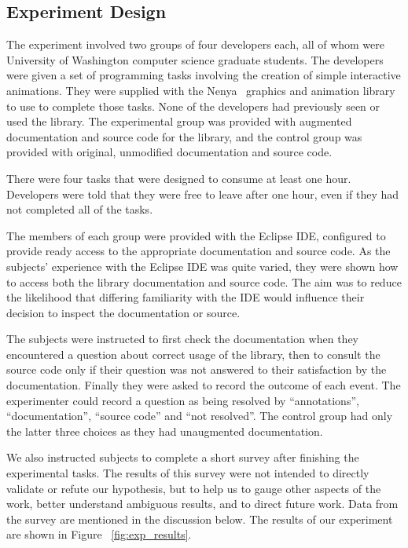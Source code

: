 \medskip
\subsection{Experiment Design}
The experiment involved two groups of four developers each, all of whom were
University of Washington computer science graduate students. The developers
were given a set of programming tasks involving the creation of simple
interactive animations. They were supplied with the Nenya~\cite{nenya} graphics
and animation library to use to complete those tasks. None of the developers had
previously seen or used the library. The experimental group was provided with
augmented documentation and source code for the library, and the control group
was provided with original, unmodified documentation and source code.

There were four tasks that were designed to consume at least one
hour. Developers were told that they were free to leave after one hour, even if
they had not completed all of the tasks.

The members of each group were provided with the Eclipse IDE, configured to
provide ready access to the appropriate documentation and source code. As the
subjects' experience with the Eclipse IDE was quite varied, they were shown how
to access both the library documentation and source code. The aim was to reduce
the likelihood that differing familiarity with the IDE would influence their
decision to inspect the documentation or source.

The subjects were instructed to first check the documentation when they
encountered a question about correct usage of the library, then to consult the
source code only if their question was not answered to their satisfaction by
the documentation. Finally they were asked to record the outcome of each event.
The experimenter could record a question as being resolved by ``annotations'',
``documentation'', ``source code'' and ``not resolved''. The control group had
only the latter three choices as they had unaugmented documentation.

We also instructed subjects to complete a short survey after finishing the
experimental tasks. The results of this survey were not intended to directly
validate or refute our hypothesis, but to help us to gauge other aspects of the
work, better understand ambiguous results, and to direct future work. Data from
the survey are mentioned in the discussion below. The results of our experiment
are shown in Figure ~\ref{fig:exp_results}.

